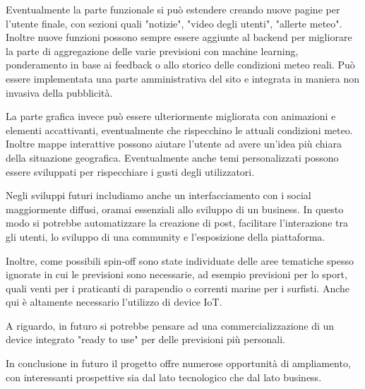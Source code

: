     Eventualmente la parte funzionale si può estendere creando nuove pagine per l'utente finale, con sezioni quali "notizie", "video degli utenti", "allerte meteo". Inoltre nuove funzioni possono sempre essere aggiunte al backend per migliorare la parte di aggregazione delle varie previsioni con machine learning, ponderamento in base ai feedback o allo storico delle condizioni meteo reali. Può essere implementata una parte amministrativa del sito e integrata in maniera non invasiva della pubblicità. 
    
    La parte grafica invece può essere ulteriormente migliorata con animazioni e elementi accattivanti, eventualmente che rispecchino le attuali condizioni meteo. Inoltre mappe interattive possono aiutare l'utente ad avere un'idea più chiara della situazione geografica. Eventualmente anche temi personalizzati possono essere sviluppati per rispecchiare i gusti degli utilizzatori.
    
    Negli sviluppi futuri includiamo anche un interfacciamento con i social maggiormente diffusi, oramai essenziali allo sviluppo di un business. In questo modo si potrebbe automatizzare la creazione di post, facilitare l'interazione tra gli utenti, lo sviluppo di una community e l'esposizione della piattaforma.
    
    Inoltre, come possibili spin-off sono state individuate delle aree tematiche spesso ignorate in cui le previsioni sono necessarie, ad esempio previsioni per lo sport, quali venti per i praticanti di parapendio o correnti marine per i surfisti. Anche qui è altamente necessario l'utilizzo di device IoT.
    
    A riguardo, in futuro si potrebbe pensare ad una commercializzazione di un device integrato "ready to use" per delle previsioni più personali.
    
    In conclusione in futuro il progetto offre numerose opportunità di ampliamento, con interessanti prospettive sia dal lato tecnologico che dal lato business.  
    
